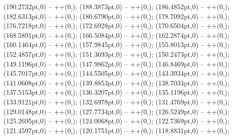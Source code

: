 {   (190.2732pt,0) -- ++(0,\doiscentesimos);
   (188.3873pt,0) -- ++(0,\doiscentesimos);
   (186.4852pt,0) -- ++(0,\doiscentesimos);
   (182.6313pt,0) -- ++(0,\doiscentesimos);
   (180.6790pt,0) -- ++(0,\doiscentesimos);
   (178.7092pt,0) -- ++(0,\doiscentesimos);
   (176.7218pt,0) -- ++(0,\doiscentesimos);
   (172.6928pt,0) -- ++(0,\doiscentesimos);
   (170.6504pt,0) -- ++(0,\doiscentesimos);
   (168.5891pt,0) -- ++(0,\doiscentesimos);
   (166.5084pt,0) -- ++(0,\doiscentesimos);
   (162.2874pt,0) -- ++(0,\doiscentesimos);
   (160.1464pt,0) -- ++(0,\doiscentesimos);
   (157.9845pt,0) -- ++(0,\doiscentesimos);
   (155.8013pt,0) -- ++(0,\doiscentesimos);
   (152.4857pt,0) -- ++(0,\centesimos);
   (151.3693pt,0) -- ++(0,\centesimos);
   (150.2473pt,0) -- ++(0,\centesimos);
   (149.1196pt,0) -- ++(0,\centesimos);
   (147.9862pt,0) -- ++(0,\centesimos);
   (146.8469pt,0) -- ++(0,\centesimos);
   (145.7017pt,0) -- ++(0,\centesimos);
   (144.5505pt,0) -- ++(0,\centesimos);
   (143.3934pt,0) -- ++(0,\centesimos);
   (141.0608pt,0) -- ++(0,\centesimos);
   (139.8853pt,0) -- ++(0,\centesimos);
   (138.7034pt,0) -- ++(0,\centesimos);
   (137.5153pt,0) -- ++(0,\centesimos);
   (136.3207pt,0) -- ++(0,\centesimos);
   (135.1196pt,0) -- ++(0,\centesimos);
   (133.9121pt,0) -- ++(0,\centesimos);
   (132.6978pt,0) -- ++(0,\centesimos);
   (131.4769pt,0) -- ++(0,\centesimos);
   (129.0148pt,0) -- ++(0,\centesimos);
   (127.7734pt,0) -- ++(0,\centesimos);
   (126.5249pt,0) -- ++(0,\centesimos);
   (125.2695pt,0) -- ++(0,\centesimos);
   (124.0068pt,0) -- ++(0,\centesimos);
   (122.7369pt,0) -- ++(0,\centesimos);
   (121.4597pt,0) -- ++(0,\centesimos);
   (120.1751pt,0) -- ++(0,\centesimos);
   (118.8831pt,0) -- ++(0,\centesimos);
}
